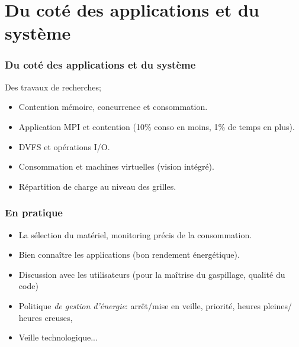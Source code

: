 \documentclass{beamer}
\begin{document}








\section{Du coté des applications et du système}

\begin{frame}
  \frametitle{Du coté des applications et du système}
  Des travaux de recherches;
  \begin{itemize}
    \item Contention mémoire, concurrence et consommation.
		\item Application MPI et contention (10\% conso en moins, 1\% de temps en plus).
    \item DVFS et opérations I/O.
    \item Consommation et machines virtuelles (vision intégré).
    \item Répartition de charge au niveau des grilles.
   \end{itemize}
\end{frame}

\begin{frame}
  \frametitle{En pratique}
  \begin{itemize}
		\item La sélection du matériel, monitoring précis de la consommation.
    \item Bien connaître les applications (bon rendement énergétique).
    \item Discussion avec les utilisateurs (pour la maîtrise du gaspillage, qualité du code)
    \item Politique {\em de gestion d'énergie}: arrêt/mise en veille, priorité, heures pleines/ heures creuses, 
    \item Veille technologique...  
  \end{itemize}
\end{frame}
\end{document}
